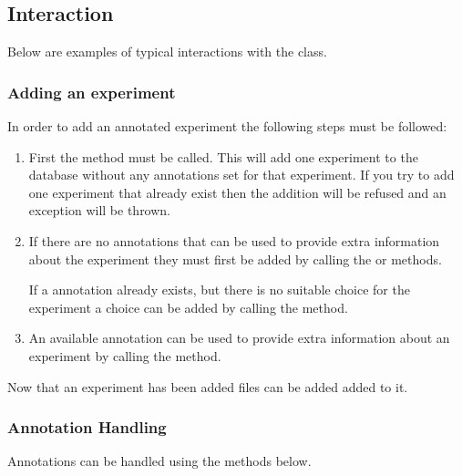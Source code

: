 \subsection{Interaction}
Below are examples of typical interactions with the  class.

\subsubsection{Adding an experiment}
In order to add an annotated experiment the following steps must be followed:
\begin{enumerate}
\item First the  method must be called. This will add one experiment to the database without any annotations set for that experiment. If you try to add one experiment that already exist then the addition will be refused and an exception will be thrown.

\item If there are no annotations that can be used to provide extra information about the experiment they must first be added by calling the  or  methods.

\subitem If a  annotation already exists, but there is no suitable choice for the experiment a choice can be added by calling the  method.

\item An available annotation can be used to provide extra information about an experiment by calling the  method.
\end{enumerate}

Now that an experiment has been added files can be added added to it.

\subsubsection{Annotation Handling}

Annotations can be handled using the methods below.

